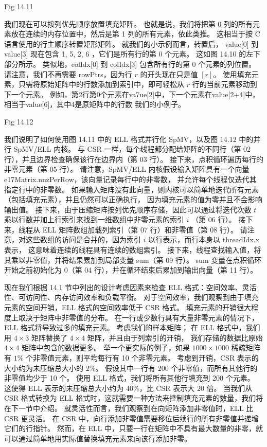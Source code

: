 {\color{red} Fig 14.11}

我们现在可以按列优先顺序放置填充矩阵。 
也就是说，我们将把第 0 列的所有元素放在连续的内存位置中，然后是第 1 列的所有元素，依此类推。 
这相当于按 $\mathrm{C}$ 语言使用的行主顺序转置矩形矩阵。 
就我们的小示例而言，转置后， value[0] 到 value[3] 现在包含 1, 5, 2, 6 ，它们是所有行的第 0 个元素。 
这如图 14.10 的左下部分所示。 类似地，colIdx[0] 到 colIdx[3] 包含所有行的第 0 个元素的列位置。 
请注意，我们不再需要 rowPtrs，因为行 $r$ 的开头现在只是值 $[r]$。 
使用填充元素，只需将原始矩阵中的行数添加到索引中，即可轻松从 $r$ 行的当前元素移动到下一个元素。 
例如，第2行第0个元素在va7ue[2]中，下一个元素在value[2+4]中，相当于value[6]，其中4是原矩阵中的行数 我们的小例子。

{\color{red} Fig 14.12}

我们说明了如何使用图 14.11 中的 ELL 格式并行化 SpMV，以及图 14.12 中的并行 SpMV/ELL 内核。 
与 CSR 一样，每个线程都分配给矩阵的不同行（第 02 行），并且边界检查确保该行在边界内（第 03 行）。 
接下来，点积循环遍历每行的非零元素（第 05 行）。 
请注意，SpMV/ELL 内核假设输入矩阵具有一个向量 e17Matrix.nnzPerRow，该向量记录每行中的非零数，
并允许每个线程仅迭代其指定行中的非零数。 
如果输入矩阵没有此向量，则内核可以简单地迭代所有元素（包括填充元素），并且仍然可以正确执行，
因为填充元素的值为零并且不会影响输出值。 
接下来，由于压缩矩阵按列优先顺序存储，因此可以通过将迭代次数 $t$ 乘以行数并加上行索引来找到一维数组中非零元素的索引 $i$ （第 06 行）。 
接下来，线程从 ELL 矩阵数组加载列索引（第 07 行）和非零值（第 08 行）。 
请注意，对这些数组的访问是合并的，因为索引 $i$ 以行表示，而行本身以 threadIdx.x 表示，
这意味着连续的线程具有连续的数组索引。 接下来，线程查找输入值，将其乘以非零值，并将结果累加到局部变量 sum（第 09 行）。 
sum 变量在点积循环开始之前初始化为 0（第 04 行），并在循环结束后累加到输出向量（第 11 行）。

现在我们根据 14.1 节中列出的设计考虑因素来检查 ELL 格式：空间效率、灵活性、可访问性、内存访问效率和负载平衡。 
对于空间效率，我们观察到由于填充元素的空间开销，ELL 格式的空间效率低于 CSR 格式。 
填充元素的开销很大程度上取决于矩阵中非零值的分布。 在一行或少数行具有大量非零元素的情况下，ELL 格式将导致过多的填充元素。 
考虑我们的样本矩阵； 在 ELL 格式中，我们用 $4 \times 3$ 矩阵替换了 $4 \times 4$ 矩阵，并且由于列索引的开销，
我们存储的数据比原始 $4 \times 4$ 矩阵中包含的数据更多。 
举一个更实际的例子，如果 $1000 \times 1000$ 稀疏矩阵有 $1 \%$ 个非零值元素，则平均每行有 10 个非零元素。 
考虑到开销，CSR 表示的大小约为未压缩总大小的 $2 \%$。 假设其中一行有 200 个非零值，而所有其他行的非零值均少于 10 个。
使用 ELL 格式，我们将所有其他行填充到 200 个元素。 这使得 ELL 表示的未压缩总大小约为 $40 \%$，比 CSR 表示大 20 倍。 
当我们从 CSR 格式转换为 ELL 格式时，这就需要一种方法来控制填充元素的数量，我们将在下一节中介绍。 
就灵活性而言，我们观察到在向矩阵添加非零值时，ELL 比 CSR 更灵活。 
在 CSR 中，向行添加非零值需要移位后续行的所有非零值并递增它们的行指针。 
然而，在 ELL 中，只要一行在矩阵中不具有最大数量的非零，就可以通过简单地用实际值替换填充元素来向该行添加非零。

